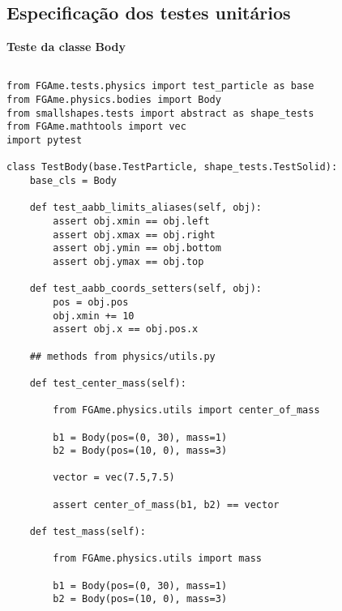 \pagestyle{empty}


\begin{anexosenv}

\partanexos

\chapter{Especificação dos testes unitários}
\label{sec:anexo1}

\textbf{Teste da classe Body}

\begin{lstlisting}

from FGAme.tests.physics import test_particle as base
from FGAme.physics.bodies import Body
from smallshapes.tests import abstract as shape_tests
from FGAme.mathtools import vec
import pytest

class TestBody(base.TestParticle, shape_tests.TestSolid):
    base_cls = Body

    def test_aabb_limits_aliases(self, obj):
        assert obj.xmin == obj.left
        assert obj.xmax == obj.right
        assert obj.ymin == obj.bottom
        assert obj.ymax == obj.top

    def test_aabb_coords_setters(self, obj):
        pos = obj.pos
        obj.xmin += 10
        assert obj.x == obj.pos.x

    ## methods from physics/utils.py

    def test_center_mass(self):

        from FGAme.physics.utils import center_of_mass

        b1 = Body(pos=(0, 30), mass=1)
        b2 = Body(pos=(10, 0), mass=3)

        vector = vec(7.5,7.5)

        assert center_of_mass(b1, b2) == vector

    def test_mass(self):

        from FGAme.physics.utils import mass

        b1 = Body(pos=(0, 30), mass=1)
        b2 = Body(pos=(10, 0), mass=3)


\end{lstlisting}
\end{anexosenv}
